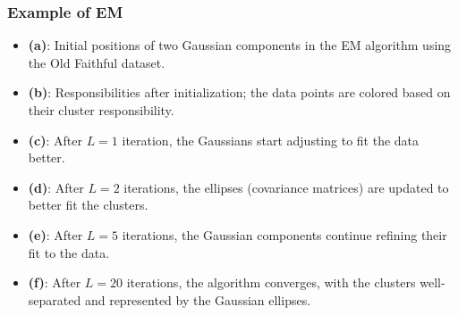 \subsubsection{Example of EM}
\begin{example}
    \begin{itemize}
        \item \textbf{(a)}: Initial positions of two Gaussian components in the EM algorithm using the Old Faithful dataset.
        \item \textbf{(b)}: Responsibilities after initialization; the data points are colored based on their cluster responsibility.
        \item \textbf{(c)}: After \( L = 1 \) iteration, the Gaussians start adjusting to fit the data better.
        \item \textbf{(d)}: After \( L = 2 \) iterations, the ellipses (covariance matrices) are updated to better fit the clusters.
        \item \textbf{(e)}: After \( L = 5 \) iterations, the Gaussian components continue refining their fit to the data.
        \item \textbf{(f)}: After \( L = 20 \) iterations, the algorithm converges, with the clusters well-separated and represented by the Gaussian ellipses.
    \end{itemize}
\end{example}